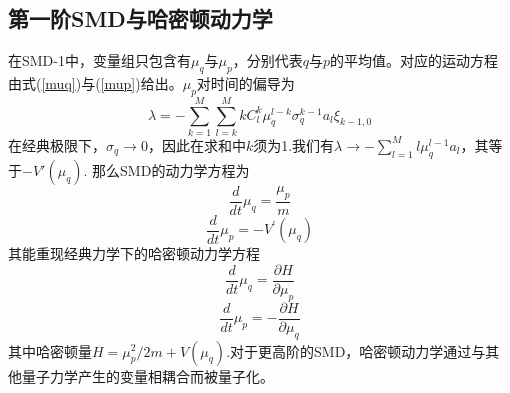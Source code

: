 \begin{subappendices}
\subsection{第一阶SMD与哈密顿动力学}
在SMD-1中，变量组只包含有$\mu_q$与$\mu_p$，分别代表$q$与$p$的平均值。对应的运动方程由式(\ref{muq})与(\ref{mup})给出。$\mu_p$对时间的偏导为
\begin{equation*}
\lambda=-\sum_{k=1}^{M} \sum_{l=k}^{M} k C_{l}^{k} \mu_{q}^{l-k} \sigma_{q}^{k-1} a_{l} \xi_{k-1,0}
\end{equation*}
在经典极限下，$\sigma_q \rightarrow 0$，因此在求和中$k$须为1.我们有$\lambda \rightarrow - \sum_{l=1}^{M} l \mu_q ^{l-1} a_l$，其等于$- V' (\mu_q)$. 那么SMD的动力学方程为
\begin{equation}
\frac{d}{d t} \mu_{q}=\frac{\mu_{p}}{m}
\end{equation}
\begin{equation}
\frac{d}{d t} \mu_{p}=-V^{\prime}\left(\mu_{q}\right)
\end{equation}
其能重现经典力学下的哈密顿动力学方程
\begin{equation}
\frac{d}{d t} \mu_{q}=\frac{\partial H}{\partial \mu_{p}}
\end{equation}
\begin{equation}
	\frac{d}{d t} \mu_{p}=-\frac{\partial H}{\partial \mu_{q}}
\end{equation}
其中哈密顿量$H = \mu_p^2 / 2m + V(\mu_q)$.对于更高阶的SMD，哈密顿动力学通过与其他量子力学产生的变量相耦合而被量子化。

\end{subappendices}
